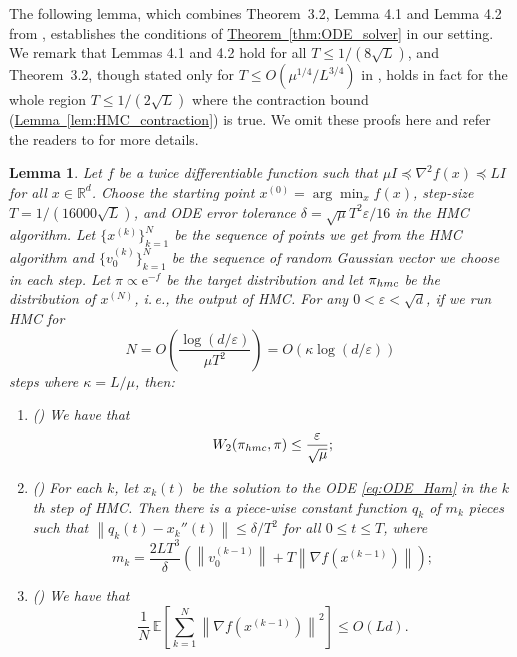 \documentclass[11pt]{article}
\numberwithin{equation}{section}
\newtheorem{lemma}[theorem]{Lemma}
\theoremstyle{definition}
\theoremstyle{plain}
\newcommand{\R}{\mathbb R}
\newcommand{\eee}{\mathrm e}
\newcommand{\ie}{i.\,e.}
\newcommand{\expref}[2]{\hyperref[#2]{#1~\ref{#2}}}
\newcommand{\Exp}{\mathbb{E}}
\newcommand{\norm}[1]{\left\lVert #1 \right\rVert}
\newcommand{\grad}{\nabla}
\newcommand{\eps}{\varepsilon}
\begin{document}
The following lemma, which combines Theorem~3.2, Lemma 4.1 and Lemma 4.2 from \cite{LSV18}, establishes the conditions of \expref{Theorem}{thm:ODE_solver} in our setting. We remark that Lemmas 4.1 and 4.2 hold for all $T \le 1/(8\sqrt{L})$, and Theorem~3.2, though stated only for $T \le O(\mu^{1/4}/L^{3/4})$ in \cite{LSV18}, holds in fact for the whole region $T \le 1/(2\sqrt{L})$ where the contraction bound (\expref{Lemma}{lem:HMC_contraction}) is true. We omit these proofs here and refer the readers to \cite{LSV18} for more details.

\begin{lemma}\label{lem:ODE_prep}
	Let $f$ be a twice differentiable function such that $\mu I \preceq \grad^2 f(x) \preceq LI$ for all $x\in \R^d$. Choose the starting point $x^{(0)} = \arg\min_x f(x)$, step-size $T = 1/(16000\sqrt{L})$, and ODE error tolerance $\delta = \sqrt{\mu}T^2 \eps/16$ in the HMC algorithm. Let $\{x^{(k)}\}_{k=1}^N$ be the sequence of points we get from the HMC algorithm and $\{v_0^{(k)}\}_{k=1}^N$ be the sequence of random Gaussian vector we choose in each step. Let $\pi \propto \eee^{-f}$ be the target distribution and let $\pi_{\textsc{hmc}}$ be the distribution of $x^{(N)}$, \ie, the output of HMC. For any $0<\eps<\sqrt{d}$, if we run HMC for 
	\begin{equation}
	N = O\left( \frac{\log(d/\eps)}{\mu T^2} \right) = O\left( \kappa \log(d/\eps) \right)
	\end{equation}
	steps where $\kappa = L/\mu$, then:
	\begin{enumerate}
		\item \emph{(\cite[Theorem 3.2]{LSV18})} We have that
		\begin{equation}
		W_2(\pi_{\textsc{hmc}},\pi) \le \frac{\eps}{\sqrt{\mu}};
		\end{equation}
		\item \emph{(\cite[Lemma 4.1]{LSV18})} For each $k$, let $x_k(t)$ be the solution to the ODE \eqref{eq:ODE_Ham} in the $k$th step of HMC. Then there is a piece-wise constant function $q_k$ of $m_k$ pieces such that $\norm{q_k(t)-x_k''(t)} \le \delta/T^2$ for all $0\le t\le T$, where
		\begin{equation}
		m_k = \frac{2LT^3}{\delta}\left( \norm{v_0^{(k-1)}} + T\norm{\grad f(x^{(k-1)})} \right);
		\end{equation}
		\item \emph{(\cite[Lemma 4.2]{LSV18})} We have that
		\begin{equation}
		\frac{1}{N}\, \Exp\left[ \sum_{k=1}^{N} \norm{\grad f(x^{(k-1)})}^2 \right] \le O(Ld).
		\end{equation}
	\end{enumerate}		
\end{lemma}
\end{document}
